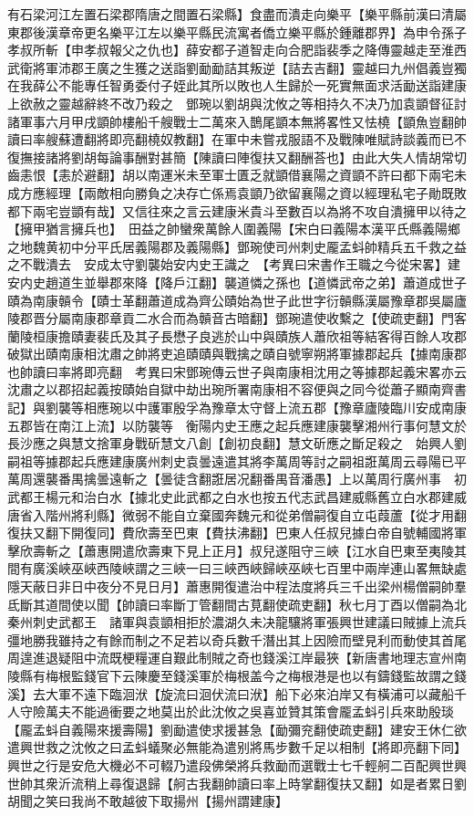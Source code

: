 有石梁河江左置石梁郡隋唐之間置石梁縣】食盡而潰走向樂平【樂平縣前漢曰清屬東郡後漢章帝更名樂平江左以樂平縣民流寓者僑立樂平縣於鍾離郡界】為申令孫子孝叔所斬【申孝叔報父之仇也】薛安都子道智走向合肥詣裴季之降傳靈越走至淮西武衛將軍沛郡王廣之生獲之送詣劉勔勔詰其叛逆【詰去吉翻】靈越曰九州倡義豈獨在我薛公不能專任智勇委付子姪此其所以敗也人生歸於一死實無面求活勔送詣建康上欲赦之靈越辭終不改乃殺之　鄧琬以劉胡與沈攸之等相持久不决乃加袁顗督征討諸軍事六月甲戌顗帥樓船千艘戰士二萬來入鵲尾顗本無將畧性又怯橈【顗魚豈翻帥讀曰率艘蘇遭翻將即亮翻橈奴教翻】在軍中未嘗戎服語不及戰陳唯賦詩談義而已不復撫接諸將劉胡每論事酬對甚簡【陳讀曰陣復扶又翻酬荅也】由此大失人情胡常切齒恚恨【恚於避翻】胡以南運米未至軍士匱乏就顗借襄陽之資顗不許曰都下兩宅未成方應經理【兩敵相向勝負之决存亡係焉袁顗乃欲留襄陽之資以經理私宅子勛既敗都下兩宅豈顗有哉】又信往來之言云建康米貴斗至數百以為將不攻自潰擁甲以待之【擁甲猶言擁兵也】　田益之帥蠻衆萬餘人圍義陽【宋白曰義陽本漢平氏縣義陽鄉之地魏黄初中分平氏居義陽郡及義陽縣】鄧琬使司州刺史龎孟蚪帥精兵五千救之益之不戰潰去　安成太守劉襲始安内史王識之　【考異曰宋書作王職之今從宋畧】建安内史趙道生並舉郡來降【降戶江翻】襲道憐之孫也【道憐武帝之弟】蕭道成世子賾為南康贑令【賾士革翻蕭道成為齊公賾始為世子此世字衍贑縣漢屬豫章郡吳屬廬陵郡晋分屬南康郡章貢二水合而為贑音古暗翻】鄧琬遣使收繫之【使疏吏翻】門客蘭陵桓康擔賾妻裴氏及其子長懋子良逃於山中與賾族人蕭欣祖等結客得百餘人攻郡破獄出賾南康相沈肅之帥將吏追賾賾與戰擒之賾自號寧朔將軍據郡起兵【據南康郡也帥讀曰率將即亮翻　考異曰宋鄧琬傳云世子與南康相沈用之等據郡起義宋畧亦云沈肅之以郡招起義按賾始自獄中劫出琬所署南康相不容便與之同今從蕭子顯南齊書記】與劉襲等相應琬以中護軍殷孚為豫章太守督上流五郡【豫章廬陵臨川安成南康五郡皆在南江上流】以防襲等　衡陽内史王應之起兵應建康襲擊湘州行事何慧文於長沙應之與慧文捨軍身戰斫慧文八創【創初良翻】慧文斫應之斷足殺之　始興人劉嗣祖等據郡起兵應建康廣州刺史袁曇遠遣其將李萬周等討之嗣祖誑萬周云尋陽已平萬周還襲番禺擒曇遠斬之【曇徒含翻誑居况翻番禺音潘愚】上以萬周行廣州事　初武都王楊元和治白水【據北史此武都之白水也按五代志武昌建威縣舊立白水郡建威唐省入階州將利縣】微弱不能自立棄國奔魏元和從弟僧嗣復自立屯葭蘆【從才用翻復扶又翻下開復同】費欣壽至巴東【費扶沸翻】巴東人任叔兒據白帝自號輔國將軍擊欣壽斬之【蕭惠開遣欣壽東下見上正月】叔兒遂阻守三峽【江水自巴東至夷陵其間有廣溪峽巫峽西陵峽謂之三峽一曰三峽西峽歸峽巫峽七百里中兩岸連山畧無缺處隱天蔽日非日中夜分不見日月】蕭惠開復遣治中程法度將兵三千出梁州楊僧嗣帥羣氐斷其道間使以聞【帥讀曰率斷丁管翻間古莧翻使疏吏翻】秋七月丁酉以僧嗣為北秦州刺史武都王　諸軍與袁顗相拒於濃湖久未决龍驤將軍張興世建議曰賊據上流兵彊地勝我雖持之有餘而制之不足若以奇兵數千潛出其上因險而壁見利而動使其首尾周遑進退疑阻中流既梗糧運自艱此制賊之奇也錢溪江岸最狹【新唐書地理志宣州南陵縣有梅根監錢官下云陳慶至錢溪軍於梅根盖今之梅根港是也以有鑄錢監故謂之錢溪】去大軍不遠下臨洄洑【旋流曰洄伏流曰洑】船下必來泊岸又有橫浦可以藏船千人守險萬夫不能過衝要之地莫出於此沈攸之吳喜並贊其策會龎孟蚪引兵來助殷琰【龎孟蚪自義陽來援壽陽】劉勔遣使求援甚急【勔彌兖翻使疏吏翻】建安王休仁欲遣興世救之沈攸之曰孟蚪蟻聚必無能為遣别將馬步數千足以相制【將即亮翻下同】興世之行是安危大機必不可輟乃遣段佛榮將兵救勔而選戰士七千輕舸二百配興世興世帥其衆沂流稍上尋復退歸【舸古我翻帥讀曰率上時掌翻復扶又翻】如是者累日劉胡聞之笑曰我尚不敢越彼下取揚州【揚州謂建康】